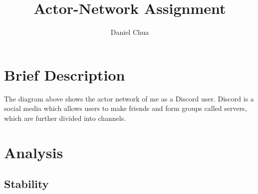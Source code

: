 \documentclass[12pt]{article}
\title{Actor-Network Assignment}
\author{Daniel Chua}
\begin{document}
\maketitle

\section{Brief Description}

The diagram above shows the actor network of me as a Discord user. Discord is a social media which allows users to make friends and form groups called servers, which are further divided into channels. 

\section{Analysis}

\subsection{Stability}
\end{document}
